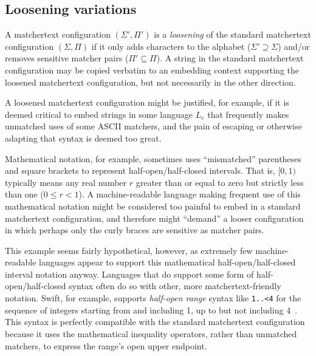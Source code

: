 \subsection{Loosening variations}

A matchertext configuration $(\Sigma',\Pi')$
is a \emph{loosening} of
the standard matchertext configuration $(\Sigma,\Pi)$
if it only adds characters to the alphabet ($\Sigma' \supseteq \Sigma$)
and/or removes sensitive matcher pairs ($\Pi' \subseteq \Pi$).
A string in the standard matchertext configuration
may be copied verbatim to an embedding context
supporting the loosened matchertext configuration,
but not necessarily in the other direction.

A loosened matchertext configuration might be justified,
for example, if it is deemed critical to embed strings in some language $L_e$
that frequently makes unmatched uses of some ASCII matchers,
and the pain of escaping or otherwise adapting that syntax is deemed too great.

Mathematical notation, for example,
sometimes uses
``mismatched'' parentheses and square brackets
to represent half-open/half-closed intervals.
That is,
$[0,1)$ typically means any real number $r$ greater than or equal to zero
but strictly less than one ($0 \le r < 1$).
A machine-readable language making frequent use of this mathematical notation
might be considered too painful to embed
in a standard matchertext configuration,
and therefore might ``demand'' a looser configuration
in which perhaps only the curly braces are sensitive as matcher pairs.

This example seems fairly hypothetical, however,
as extremely few machine-readable languages
appear to support this mathematical
half-open/half-closed interval notation anyway.
Languages that do support some form of half-open/half-closed syntax
often do so with other, more matchertext-friendly notation.
Swift, for example,
supports \emph{half-open range} syntax like \verb|1..<4|
for the sequence of integers starting from and including 1,
up to but not including 4~\cite{apple22swift}.
This syntax is perfectly compatible with the standard matchertext configuration
because it uses the mathematical inequality operators,
rather than unmatched matchers,
to express the range's open upper endpoint.
